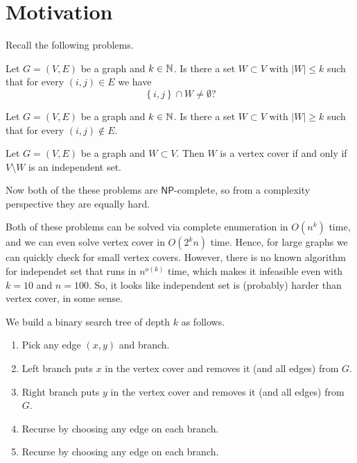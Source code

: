 
\section{Motivation}

Recall the following problems.

\begin{problem}
	Let $G = (V,E)$ be a graph and $k \in \mathbb{N}$.
	Is there a set $W \subset V$ with $\left\lvert W \right\rvert \leq k$
	such that for every $(i,j) \in E$ we have
	\[
		\left\{ i,j \right\} \cap W \neq \emptyset?
	\]
\end{problem}

\begin{problem}
	Let $G = (V,E)$ be a graph and $k \in \mathbb{N}$.
	Is there a set $W \subset V$ with
	$\left\lvert W \right\rvert \geq k$
	such that for every $(i,j) \not\in E$.
\end{problem}

Let $G = (V,E)$ be a graph and $W \subset V$.
Then $W$ is a vertex cover if and only if $V \setminus W$
is an independent set.

Now both of the these problems are $\mathsf{NP}$-complete,
so from a complexity perspective they are equally hard.

Both of these problems can be solved via complete enumeration
in $O(n^k)$ time, and we can even solve
vertex cover in $O(2^k n)$ time.
Hence, for large graphs we can quickly check for small vertex covers.
However, there is no known algorithm for independet set that
runs in $n^{o(k)}$ time, which makes it infeasible
even with $k = 10$ and $n = 100$.
So, it looks like independent set is (probably) harder than vertex cover,
in some sense.

\begin{algorithm}
	We build a binary search tree of depth $k$ as follows.
	\begin{enumerate}
		\item Pick any edge $(x,y)$ and branch.

		\item Left branch puts $x$ in the vertex cover and removes
			it (and all edges) from $G$.

		\item Right branch puts $y$ in the vertex cover and removes
			it (and all edges) from $G$.

		\item Recurse by choosing any edge on each branch.

		\item Recurse by choosing any edge on
			each branch.
	\end{enumerate}
\end{algorithm}

